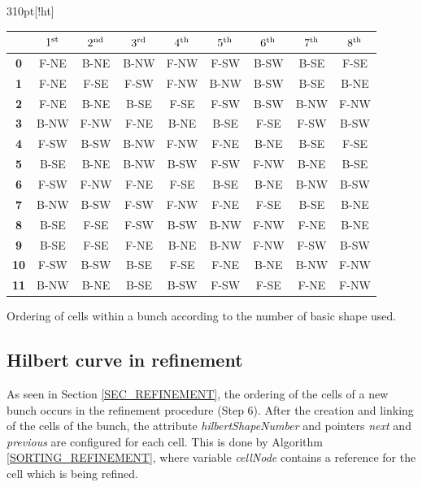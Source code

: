 \begin{acmtable}{310pt}[!ht]
    \begin{center}
        \begin{tabular}{|c|c|c|c|c|c|c|c|c|}
            \hline
                & \boldmath$1^{\rm st}$ & \boldmath$2^{\rm nd}$ & \boldmath$3^{\rm rd}$ & \boldmath$4^{\rm th}$
                & \boldmath$5^{\rm th}$ & \boldmath$6^{\rm th}$ & \boldmath$7^{\rm th}$ & \boldmath$8^{\rm th}$ \\
            \hline
            \textbf{0} & F-NE & B-NE & B-NW & F-NW & F-SW & B-SW & B-SE & F-SE \\
            \hline
            \textbf{1} & F-NE & F-SE & F-SW & F-NW & B-NW & B-SW & B-SE & B-NE \\
            \hline
            \textbf{2} & F-NE & B-NE & B-SE & F-SE & F-SW & B-SW & B-NW & F-NW \\
            \hline
            \textbf{3} & B-NW & F-NW & F-NE & B-NE & B-SE & F-SE & F-SW & B-SW \\
            \hline
            \textbf{4} & F-SW & B-SW & B-NW & F-NW & F-NE & B-NE & B-SE & F-SE \\
            \hline
            \textbf{5} & B-SE & B-NE & B-NW & B-SW & F-SW & F-NW & B-NE & B-SE \\
            \hline
            \textbf{6} & F-SW & F-NW & F-NE & F-SE & B-SE & B-NE & B-NW & B-SW \\
            \hline
            \textbf{7} & B-NW & B-SW & F-SW & F-NW & F-NE & F-SE & B-SE & B-NE \\
            \hline
            \textbf{8} & B-SE & F-SE & F-SW & B-SW & B-NW & F-NW & F-NE & B-NE \\
            \hline
            \textbf{9} & B-SE & F-SE & F-NE & B-NE & B-NW & F-NW & F-SW & B-SW \\
            \hline
            \textbf{10} & F-SW & B-SW & B-SE & F-SE & F-NE & B-NE & B-NW & F-NW \\
            \hline
            \textbf{11} & B-NW & B-NE & B-SE & B-SW & F-SW & F-SE & F-NE & F-NW \\
            \hline
        \end{tabular}
    \end{center}
    \caption{Ordering of cells within a bunch according to the number of basic shape used.}
    \label{TAB_DEFINITION_OF_BASIC_SHAPES}
\end{acmtable}

\subsection{Hilbert curve in refinement} \label{SUBSEC_HILBERT_CURVE_REFINEMENT}
As seen in Section \ref{SEC_REFINEMENT}, the ordering of the cells
of a new bunch occurs in the refinement procedure (Step 6). After
the creation and linking of the cells of the bunch, the attribute
\textit{hilbertShapeNumber} and pointers \textit{next} and
\textit{previous} are configured for each cell. This is done by
Algorithm \ref{SORTING_REFINEMENT}, where variable \textit{cellNode}
contains a reference for the cell which is being refined.

